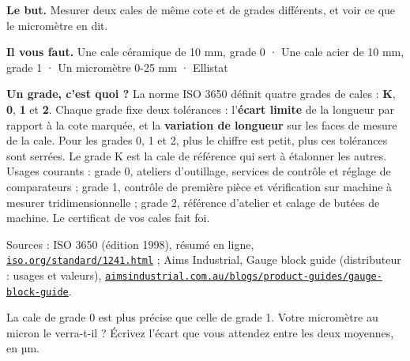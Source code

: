 \documentclass[10pt,a4paper]{article}
\begin{document}
\thispagestyle{fancy}
\begin{tcolorbox}[boite]\textbf{Le but.} Mesurer deux cales de même cote et de grades différents, et voir ce que le micromètre en dit.\par\textbf{Il vous faut.} Une cale céramique de 10 mm, grade 0 · Une cale acier de 10 mm, grade 1 · Un micromètre 0-25 mm · Ellistat\end{tcolorbox}
\begin{tcolorbox}[boite]\textbf{Un grade, c'est quoi ?} La norme ISO 3650 définit quatre grades de cales : \textbf{K}, \textbf{0}, \textbf{1} et \textbf{2}. Chaque grade fixe deux tolérances : l'\textbf{écart limite} de la longueur par rapport à la cote marquée, et la \textbf{variation de longueur} sur les faces de mesure de la cale. Pour les grades 0, 1 et 2, plus le chiffre est petit, plus ces tolérances sont serrées. Le grade K est la cale de référence qui sert à étalonner les autres. Usages courants : grade 0, ateliers d'outillage, services de contrôle et réglage de comparateurs ; grade 1, contrôle de première pièce et vérification sur machine à mesurer tridimensionnelle ; grade 2, référence d'atelier et calage de butées de machine. Le certificat de vos cales fait foi.\par{\footnotesize Sources : ISO 3650 (édition 1998), résumé en ligne, \href{https://www.iso.org/standard/1241.html}{\nolinkurl{iso.org/standard/1241.html}} ; Aims Industrial, Gauge block guide (distributeur : usages et valeurs), \href{https://aimsindustrial.com.au/blogs/product-guides/gauge-block-guide}{\nolinkurl{aimsindustrial.com.au/blogs/product-guides/gauge-block-guide}}.}\end{tcolorbox}
\begin{tcolorbox}[pred]La cale de grade 0 est plus précise que celle de grade 1. Votre micromètre au micron le verra-t-il ? Écrivez l'écart que vous attendez entre les deux moyennes, en µm.\reponse\end{tcolorbox}
\end{document}
